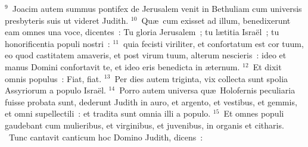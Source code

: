 ${}^{9}$~Joacim autem summus pontifex de Jerusalem venit in Bethuliam cum universis presbyteris suis ut videret Judith.
${}^{10}$~Qu\ae\ cum exisset ad illum, benedixerunt eam omnes una voce, dicentes~: Tu gloria Jerusalem~; tu l\ae titia Isra\"el~; tu honorificentia populi nostri~:
${}^{11}$~quia fecisti viriliter, et confortatum est cor tuum, eo quod castitatem amaveris, et post virum tuum, alterum nescieris~: ideo et manus Domini confortavit te, et ideo eris benedicta in \ae ternum.
${}^{12}$~Et dixit omnis populus~: Fiat, fiat.
${}^{13}$~Per dies autem triginta, vix collecta sunt spolia Assyriorum a populo Isra\"el.
${}^{14}$~Porro autem universa qu\ae\ Holofernis peculiaria fuisse probata sunt, dederunt Judith in auro, et argento, et vestibus, et gemmis, et omni supellectili~: et tradita sunt omnia illi a populo.
${}^{15}$~Et omnes populi gaudebant cum mulieribus, et virginibus, et juvenibus, in organis et citharis.
~Tunc cantavit canticum hoc Domino Judith, dicens~:
